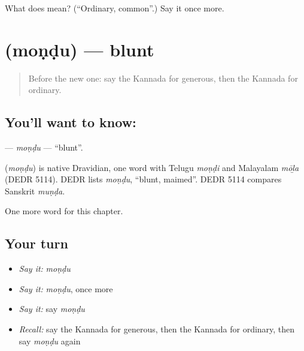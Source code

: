 \begin{tcolorbox}[breakable,colback=teal!4,colframe=teal!35!black,title={Before you move on}]
What does  mean? (\textquotedblleft{}Ordinary, common\textquotedblright{}.) Say it once more.
\end{tcolorbox}
\section[\texorpdfstring{\kn{ಮೊಂಡು} (moṇḍu)}{ಮೊಂಡು (moṇḍu)}]{ (moṇḍu) — blunt}

\label{lesson:KA-C219-mondu}



\begin{quote}
Before the new one: say the Kannada for generous, then the Kannada for ordinary.
\end{quote}

\subsection*{You'll want to know: }
\textbf{} — \emph{moṇḍu} — \textquotedblleft{}blunt\textquotedblright{}.

\begin{cousinweb}
\textbf{} (\emph{moṇḍu}) is native Dravidian, one word with Telugu \emph{moṇḍi} and Malayalam \emph{mōḻa} (DEDR 5114). DEDR lists \emph{moṇḍu}, \textquotedblleft{}blunt, maimed\textquotedblright{}. DEDR 5114 compares Sanskrit \emph{muṇḍa}.
\end{cousinweb}

\begin{grammarlens}[title={What you've built}]
One more word for this chapter.
\end{grammarlens}

\subsection*{Your turn}
\begin{itemize}
\raggedright
  \item \emph{Say it:} \emph{moṇḍu}
  \item \emph{Say it:} \emph{moṇḍu}, once more
  \item \emph{Say it:} say \emph{moṇḍu}
  \item \emph{Recall:} say the Kannada for generous, then the Kannada for ordinary, then say \emph{moṇḍu} again
\end{itemize}

